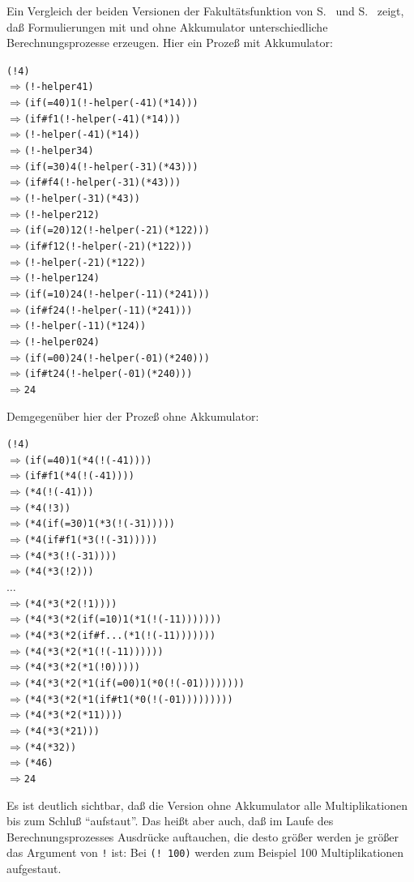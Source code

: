Ein Vergleich der beiden Versionen der Fakultätsfunktion von
S.~\pageref{page:factorial} und S.~\pageref{page:factorial-tail} zeigt, daß
Formulierungen mit und ohne Akkumulator
unterschiedliche Berechnungsprozesse erzeugen.  Hier ein Prozeß mit
Akkumulator:
%
\begin{alltt}
(! 4)
\(\Longrightarrow\) (!-helper 4 1)
\(\Longrightarrow\) (if (= 4 0) 1 (!-helper (- 4 1) (* 1 4)))
\(\Longrightarrow\) (if #f 1 (!-helper (- 4 1) (* 1 4)))
\(\Longrightarrow\) (!-helper (- 4 1) (* 1 4))
\(\Longrightarrow\) (!-helper 3 4)
\(\Longrightarrow\) (if (= 3 0) 4 (!-helper (- 3 1) (* 4 3)))
\(\Longrightarrow\) (if #f 4 (!-helper (- 3 1) (* 4 3)))
\(\Longrightarrow\) (!-helper (- 3 1) (* 4 3))
\(\Longrightarrow\) (!-helper 2 12)
\(\Longrightarrow\) (if (= 2 0) 12 (!-helper (- 2 1) (* 12 2)))
\(\Longrightarrow\) (if #f 12 (!-helper (- 2 1) (* 12 2)))
\(\Longrightarrow\) (!-helper (- 2 1) (* 12 2))
\(\Longrightarrow\) (!-helper 1 24)
\(\Longrightarrow\) (if (= 1 0) 24 (!-helper (- 1 1) (* 24 1)))
\(\Longrightarrow\) (if #f 24 (!-helper (- 1 1) (* 24 1)))
\(\Longrightarrow\) (!-helper (- 1 1) (* 1 24))
\(\Longrightarrow\) (!-helper 0 24)
\(\Longrightarrow\) (if (= 0 0) 24 (!-helper (- 0 1) (* 24 0)))
\(\Longrightarrow\) (if #t 24 (!-helper (- 0 1) (* 24 0)))
\(\Longrightarrow\) 24
\end{alltt}
%
Demgegenüber hier der Prozeß ohne Akkumulator:
%
\begin{alltt}
(! 4)
\(\Longrightarrow\) (if (= 4 0) 1 (* 4 (! (- 4 1))))
\(\Longrightarrow\) (if #f 1 (* 4 (! (- 4 1))))
\(\Longrightarrow\) (* 4 (! (- 4 1)))
\(\Longrightarrow\) (* 4 (! 3))
\(\Longrightarrow\) (* 4 (if (= 3 0) 1 (* 3 (! (- 3 1)))))
\(\Longrightarrow\) (* 4 (if #f 1 (* 3 (! (- 3 1)))))
\(\Longrightarrow\) (* 4 (* 3 (! (- 3 1))))
\(\Longrightarrow\) (* 4 (* 3 (! 2)))
\(\ldots\)
\(\Longrightarrow\) (* 4 (* 3 (* 2 (! 1))))
\(\Longrightarrow\) (* 4 (* 3 (* 2 (if (= 1 0) 1 (* 1 (! (- 1 1)))))))
\(\Longrightarrow\) (* 4 (* 3 (* 2 (if #f ... (* 1 (! (- 1 1)))))))
\(\Longrightarrow\) (* 4 (* 3 (* 2 (* 1 (! (- 1 1))))))
\(\Longrightarrow\) (* 4 (* 3 (* 2 (* 1 (! 0)))))
\(\Longrightarrow\) (* 4 (* 3 (* 2 (* 1 (if (= 0 0) 1 (* 0 (! (- 0 1))))))))
\(\Longrightarrow\) (* 4 (* 3 (* 2 (* 1 (if #t 1 (* 0 (! (- 0 1)))))))))
\(\Longrightarrow\) (* 4 (* 3 (* 2 (* 1 1))))
\(\Longrightarrow\) (* 4 (* 3 (* 2 1)))
\(\Longrightarrow\) (* 4 (* 3 2))
\(\Longrightarrow\) (* 4 6)
\(\Longrightarrow\) 24
\end{alltt}
%
Es ist deutlich sichtbar, daß die Version ohne Akkumulator alle
Multiplikationen bis zum Schluß "`aufstaut"'.  Das heißt aber auch,
daß im Laufe des Berechnungsprozesses Ausdrücke auftauchen, die desto
größer werden je größer das Argument von \texttt{!} ist: Bei
\texttt{(!  100)} werden zum Beispiel 100 Multiplikationen aufgestaut.

